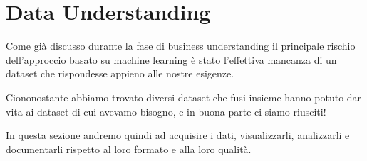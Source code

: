 \documentclass[a4paper, 11pt, oneside]{report}
\begin{document}
            \newpage
            \section{Data Understanding}
            Come già discusso durante la fase di business understanding il principale rischio dell'approccio basato su machine
            learning è stato l'effettiva mancanza di un dataset che rispondesse appieno alle nostre esigenze.
            \par \noindent Ciononostante abbiamo trovato diversi dataset che fusi insieme hanno potuto
            dar vita ai dataset di cui avevamo bisogno, e in buona parte ci siamo riusciti!
            \par \noindent In questa sezione andremo quindi ad acquisire i dati, visualizzarli, analizzarli e documentarli rispetto al loro
            formato e alla loro qualità.
\end{document}
